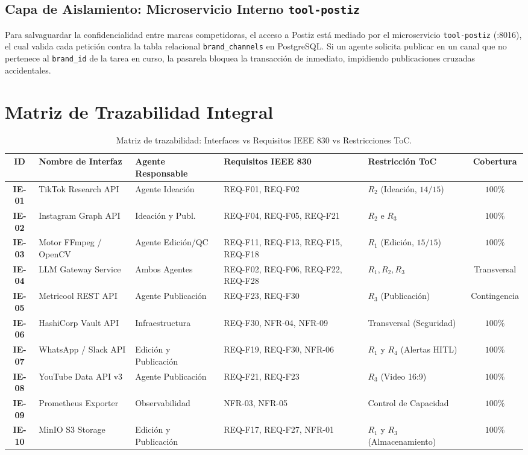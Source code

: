 \documentclass[11pt,a4paper]{article}
\begin{document}
\subsection{Capa de Aislamiento: Microservicio Interno \texttt{tool-postiz}}\label{sec:tool-postiz}

Para salvaguardar la confidencialidad entre marcas competidoras, el acceso a Postiz está mediado por el microservicio \texttt{tool-postiz} (:8016), el cual valida cada petición contra la tabla relacional \texttt{brand\_channels} en PostgreSQL. Si un agente solicita publicar en un canal que no pertenece al \texttt{brand\_id} de la tarea en curso, la pasarela bloquea la transacción de inmediato, impidiendo publicaciones cruzadas accidentales.

\newpage
\section{Matriz de Trazabilidad Integral}\label{sec:trazabilidad}

\begin{table}[h!]
\centering
\scriptsize
\begin{tabular}{c p{3.2cm} p{2.8cm} p{2.8cm} p{2.2cm} c}
\toprule
\textbf{ID} & \textbf{Nombre de Interfaz} & \textbf{Agente Responsable} & \textbf{Requisitos IEEE 830} & \textbf{Restricción ToC} & \textbf{Cobertura} \\
\midrule
\textbf{IE-01} & TikTok Research API & Agente Ideación & REQ-F01, REQ-F02 & $R_2$ (Ideación, $14/15$) & $100\%$ \\
\textbf{IE-02} & Instagram Graph API & Ideación y Publ. & REQ-F04, REQ-F05, REQ-F21 & $R_2$ e $R_3$ & $100\%$ \\
\textbf{IE-03} & Motor FFmpeg / OpenCV & Agente Edición/QC & REQ-F11, REQ-F13, REQ-F15, REQ-F18 & $R_1$ (Edición, $15/15$) & $100\%$ \\
\textbf{IE-04} & LLM Gateway Service & Ambos Agentes & REQ-F02, REQ-F06, REQ-F22, REQ-F28 & $R_1, R_2, R_3$ & Transversal \\
\textbf{IE-05} & Metricool REST API & Agente Publicación & REQ-F23, REQ-F30 & $R_3$ (Publicación) & Contingencia \\
\textbf{IE-06} & HashiCorp Vault API & Infraestructura & REQ-F30, NFR-04, NFR-09 & Transversal (Seguridad) & $100\%$ \\
\textbf{IE-07} & WhatsApp / Slack API & Edición y Publicación & REQ-F19, REQ-F30, NFR-06 & $R_1$ y $R_4$ (Alertas HITL) & $100\%$ \\
\textbf{IE-08} & YouTube Data API v3 & Agente Publicación & REQ-F21, REQ-F23 & $R_3$ (Video 16:9) & $100\%$ \\
\textbf{IE-09} & Prometheus Exporter & Observabilidad & NFR-03, NFR-05 & Control de Capacidad & $100\%$ \\
\textbf{IE-10} & MinIO S3 Storage & Edición y Publicación & REQ-F17, REQ-F27, NFR-01 & $R_1$ y $R_3$ (Almacenamiento) & $100\%$ \\
\bottomrule
\end{tabular}
\caption{Matriz de trazabilidad: Interfaces vs Requisitos IEEE 830 vs Restricciones ToC.}
\end{table}
\end{document}
